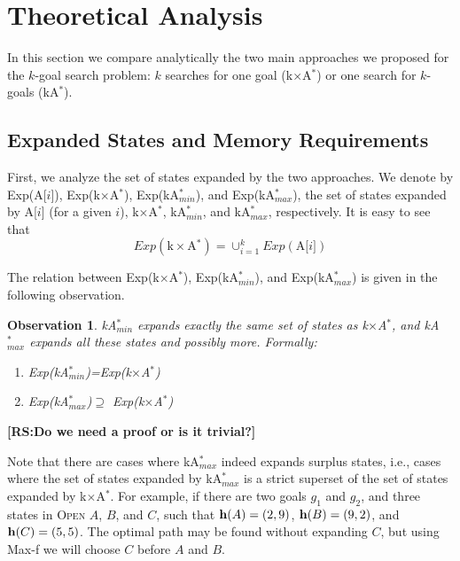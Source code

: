 \documentclass{aicom2e}
\newtheorem{observation}{Observation}
\newcommand{\kgs}{$k$-goal search}
\newcommand{\kastar}{kA$^*$}
\newcommand{\kastarmin}{kA$^*_{min}$}
\newcommand{\kastarmax}{kA$^*_{max}$}
\newcommand{\kxastar}{k$\times$A$^*$}
\newcommand{\astari}[1]{A[$#1$]}
\newcommand{\maxf}{Max-f}
\newcommand{\open}{\textsc{Open}}
\newcommand{\roni}[1]{\textbf{[RS:#1]}}
\begin{document}

\section{Theoretical Analysis}
In this section we compare analytically the two main approaches we proposed for the \kgs{} problem: $k$ searches for one goal (\kxastar{}) or one search for $k$-goals (\kastar{}). 

\subsection{Expanded States and Memory Requirements}
First, we analyze the set of states expanded by the two approaches.  
We denote by Exp(\astari{i}), Exp(\kxastar{}), Exp(\kastarmin), and Exp(\kastarmax), 
the set of states expanded by \astari{i} (for a given $i$), \kxastar{}, \kastarmin, and \kastarmax{}, respectively. It is easy to see that
\[ Exp(\text{\kxastar{}})=\cup_{i=1}^k Exp(\text{\astari{i}}) \]
 
The relation between Exp(\kxastar{}), Exp(\kastarmin), and Exp(\kastarmax) is given in the following observation.
\begin{observation}
	\kastarmin{} expands exactly the same set of states as \kxastar{}, 
	and \kastarmax{} expands all these states and possibly more. Formally:
	\begin{enumerate}
		\item Exp(\kastarmin{})=Exp(\kxastar{})
		\item Exp(\kastarmax{})$\supseteq$ Exp(\kxastar{})
	\end{enumerate}
\label{obs:expandedStates}
\end{observation}
\roni{Do we need a proof or is it trivial?}

Note that there are cases where \kastarmax{} indeed expands surplus states, i.e., cases where the set of states expanded by \kastarmax{} is a strict superset of the set of states expanded by \kxastar{}. 
For example, if there are two goals $g_1$ and $g_2$, and three states in \open{} $A$, $B$, and $C$, 
such that ${\bf h}(A)=(2,9)$, ${\bf h}(B)=(9,2)$, and ${\bf h}(C)=(5,5)$. The optimal path may be found without expanding $C$, but using \maxf{} we will choose $C$ before $A$ and $B$. 
\end{document}
